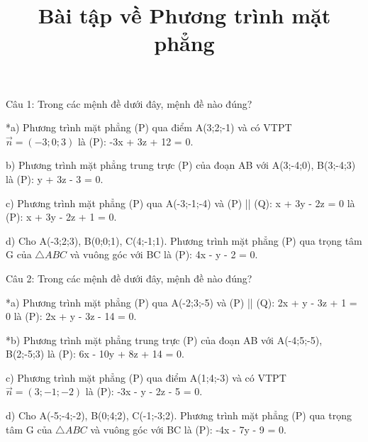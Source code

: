 \documentclass[a4paper,12pt]{article}
\begin{document}
\title{Bài tập về Phương trình mặt phẳng}
\maketitle
Câu 1: Trong các mệnh đề dưới đây, mệnh đề nào đúng?

*a) Phương trình mặt phẳng (P) qua điểm A(3;2;-1) và có VTPT \(\vec{n}=(-3;0;3)\) là (P): -3x + 3z + 12 = 0.

b) Phương trình mặt phẳng trung trực (P) của đoạn AB với A(3;-4;0), B(3;-4;3) là (P): y + 3z - 3 = 0.

c) Phương trình mặt phẳng (P) qua A(-3;-1;-4) và (P) || (Q): x + 3y - 2z = 0 là (P): x + 3y - 2z + 1 = 0.

d) Cho A(-3;2;3), B(0;0;1), C(4;-1;1). Phương trình mặt phẳng (P) qua trọng tâm G của \(\triangle ABC\) và vuông góc với BC là (P): 4x - y - 2 = 0.



Câu 2: Trong các mệnh đề dưới đây, mệnh đề nào đúng?

*a) Phương trình mặt phẳng (P) qua A(-2;3;-5) và (P) || (Q): 2x + y - 3z + 1 = 0 là (P): 2x + y - 3z - 14 = 0.

*b) Phương trình mặt phẳng trung trực (P) của đoạn AB với A(-4;5;-5), B(2;-5;3) là (P): 6x - 10y + 8z + 14 = 0.

c) Phương trình mặt phẳng (P) qua điểm A(1;4;-3) và có VTPT \(\vec{n}=(3;-1;-2)\) là (P): -3x - y - 2z - 5 = 0.

d) Cho A(-5;-4;-2), B(0;4;2), C(-1;-3;2). Phương trình mặt phẳng (P) qua trọng tâm G của \(\triangle ABC\) và vuông góc với BC là (P): -4x - 7y - 9 = 0.
\end{document}
